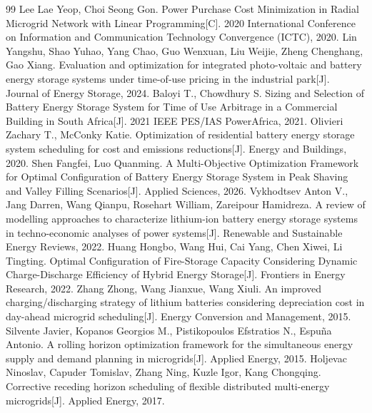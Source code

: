 \begin{thebibliography}{99}
Lee Lae Yeop, Choi Seong Gon. Power Purchase Cost Minimization in Radial Microgrid Network with Linear Programming[C]. 2020 International Conference on Information and Communication Technology Convergence (ICTC), 2020.
Lin Yangshu, Shao Yuhao, Yang Chao, Guo Wenxuan, Liu Weijie, Zheng Chenghang, Gao Xiang. Evaluation and optimization for integrated photo-voltaic and battery energy storage systems under time-of-use pricing in the industrial park[J]. Journal of Energy Storage, 2024.
Baloyi T., Chowdhury S. Sizing and Selection of Battery Energy Storage System for Time of Use Arbitrage in a Commercial Building in South Africa[J]. 2021 IEEE PES/IAS PowerAfrica, 2021.
Olivieri Zachary T., McConky Katie. Optimization of residential battery energy storage system scheduling for cost and emissions reductions[J]. Energy and Buildings, 2020.
Shen Fangfei, Luo Quanming. A Multi-Objective Optimization Framework for Optimal Configuration of Battery Energy Storage System in Peak Shaving and Valley Filling Scenarios[J]. Applied Sciences, 2026.
Vykhodtsev Anton V., Jang Darren, Wang Qianpu, Rosehart William, Zareipour Hamidreza. A review of modelling approaches to characterize lithium-ion battery energy storage systems in techno-economic analyses of power systems[J]. Renewable and Sustainable Energy Reviews, 2022.
Huang Hongbo, Wang Hui, Cai Yang, Chen Xiwei, Li Tingting. Optimal Configuration of Fire-Storage Capacity Considering Dynamic Charge-Discharge Efficiency of Hybrid Energy Storage[J]. Frontiers in Energy Research, 2022.
Zhang Zhong, Wang Jianxue, Wang Xiuli. An improved charging/discharging strategy of lithium batteries considering depreciation cost in day-ahead microgrid scheduling[J]. Energy Conversion and Management, 2015.
Silvente Javier, Kopanos Georgios M., Pistikopoulos Efstratios N., Espuña Antonio. A rolling horizon optimization framework for the simultaneous energy supply and demand planning in microgrids[J]. Applied Energy, 2015.
Holjevac Ninoslav, Capuder Tomislav, Zhang Ning, Kuzle Igor, Kang Chongqing. Corrective receding horizon scheduling of flexible distributed multi-energy microgrids[J]. Applied Energy, 2017.

\end{thebibliography}
